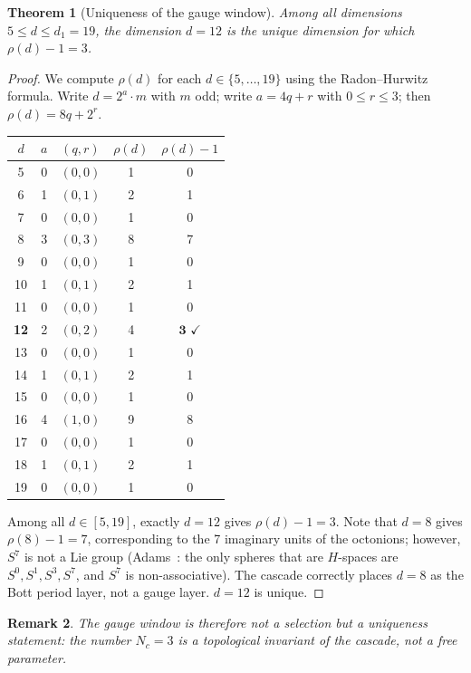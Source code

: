 \documentclass[12pt,a4paper]{article}
\newtheorem{theorem}{Theorem}[section]
\newtheorem{remark}[theorem]{Remark}
\begin{document}
\begin{theorem}[Uniqueness of the gauge window]\label{thm:adams-unique}
Among all dimensions $5\leq d\leq d_1=19$, the dimension $d=12$ is the \emph{unique}
dimension for which $\rho(d)-1=3$.
\end{theorem}
\begin{proof}
We compute $\rho(d)$ for each $d\in\{5,\ldots,19\}$ using the Radon--Hurwitz formula.
Write $d=2^a\cdot m$ with $m$ odd; write $a=4q+r$ with $0\leq r\leq 3$; then
$\rho(d)=8q+2^r$.

\begin{center}
\renewcommand{\arraystretch}{1.15}
\begin{tabular}{ccccc}
\toprule
$d$ & $a$ & $(q,r)$ & $\rho(d)$ & $\rho(d)-1$ \\
\midrule
5  & 0 & $(0,0)$ & 1 & 0 \\
6  & 1 & $(0,1)$ & 2 & 1 \\
7  & 0 & $(0,0)$ & 1 & 0 \\
8  & 3 & $(0,3)$ & 8 & 7 \\
9  & 0 & $(0,0)$ & 1 & 0 \\
10 & 1 & $(0,1)$ & 2 & 1 \\
11 & 0 & $(0,0)$ & 1 & 0 \\
\textbf{12} & 2 & $(0,2)$ & 4 & $\mathbf{3}$ $\checkmark$ \\
13 & 0 & $(0,0)$ & 1 & 0 \\
14 & 1 & $(0,1)$ & 2 & 1 \\
15 & 0 & $(0,0)$ & 1 & 0 \\
16 & 4 & $(1,0)$ & 9 & 8 \\
17 & 0 & $(0,0)$ & 1 & 0 \\
18 & 1 & $(0,1)$ & 2 & 1 \\
19 & 0 & $(0,0)$ & 1 & 0 \\
\bottomrule
\end{tabular}
\end{center}

Among all $d\in[5,19]$, exactly $d=12$ gives $\rho(d)-1=3$. Note that $d=8$ gives
$\rho(8)-1=7$, corresponding to the 7 imaginary units of the octonions; however,
$S^7$ is not a Lie group (Adams~\cite{adams60}: the only spheres that are $H$-spaces are
$S^0,S^1,S^3,S^7$, and $S^7$ is non-associative). The cascade correctly places $d=8$
as the Bott period layer, not a gauge layer. $d=12$ is unique.
\end{proof}

\begin{remark}
The gauge window is therefore not a selection but a uniqueness statement: the number
$N_c=3$ is a topological invariant of the cascade, not a free parameter.
\end{remark}
\end{document}
